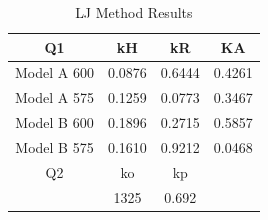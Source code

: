 \documentclass[a4paper,12pt]{article} %
\begin{document}
\clearpage
\begin{table}[ht]
    \caption{LJ Method Results}
    \centering
    \begin{tabular}{|c|c|c|c|}
        \hline
        Q1 & kH & kR & KA \\
        \hline   
        Model A 600& 0.0876& 0.6444& 0.4261 \\
        Model A 575& 0.1259& 0.0773& 0.3467 \\
        Model B 600& 0.1896& 0.2715& 0.5857 \\
        Model B 575& 0.1610& 0.9212& 0.0468 \\
        \hline
        Q2 & ko & kp&\\
        \hline
         & 1325 & 0.692 &  \\
        \hline
    \end{tabular}
\end{table}
\end{document}
